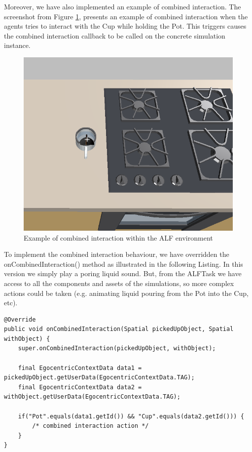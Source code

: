 Moreover, we have also implemented an example of combined interaction. The screenshot from Figure \ref{fig:impl_combined_interaction}, presents an example of combined interaction when the agents tries to interact with the Cup while holding the Pot. This triggers causes the combined interaction callback to be called on the concrete simulation instance.
\begin{figure}[H]
	\centering
	\includegraphics[width=0.8\linewidth]{gfx/Chapter4/pot_with_cup}
	\caption{Example of combined interaction within the ALF environment}
	\label{fig:impl_combined_interaction}
\end{figure}

To implement the combined interaction behaviour, we have overridden the onCombinedInteraction() method as illustrated in the following Listing. In this version we simply play a poring liquid sound. But, from the ALFTask we have access to all the components and assets of the simulations, so more complex actions could be taken (e.g. animating liquid pouring from the Pot into the Cup, etc).
\begin{lstlisting}
@Override
public void onCombinedInteraction(Spatial pickedUpObject, Spatial withObject) {
    super.onCombinedInteraction(pickedUpObject, withObject);    
    
    final EgocentricContextData data1 = pickedUpObject.getUserData(EgocentricContextData.TAG);
    final EgocentricContextData data2 = withObject.getUserData(EgocentricContextData.TAG);

    if("Pot".equals(data1.getId()) && "Cup".equals(data2.getId())) {
        /* combined interaction action */
    }
}
\end{lstlisting}

